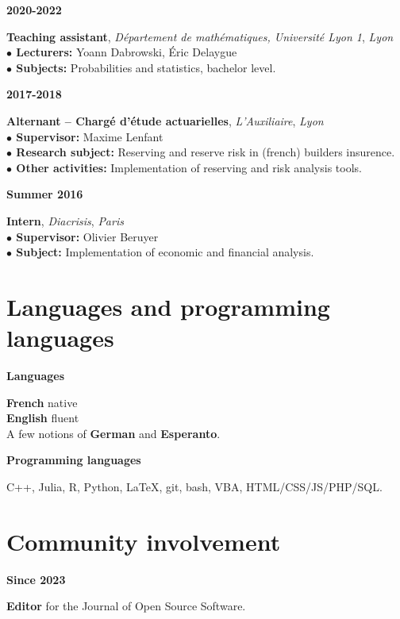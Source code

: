 \documentclass[a4paper,11pt]{article}
\newcommand{\tabcv}[2]{
\begin{minipage}[t]{0.12\linewidth}
\textbf{\footnotesize #1}
\end{minipage}\hfill
\begin{minipage}[t]{0.85\linewidth}
#2
\end{minipage}
\vspace{1em}
}
\begin{document}
\begin{flushleft}
\tabcv{2020-2022}{
\textbf{Teaching assistant}, \textit{Département de mathématiques, Université Lyon 1}, \textit{Lyon}\\[0.5em]
{\footnotesize
\textbf{$\bullet$ Lecturers:} Yoann Dabrowski, Éric Delaygue\\
\textbf{$\bullet$ Subjects:} Probabilities and statistics, bachelor level.\\
}
}

\tabcv{2017-2018}{
\textbf{Alternant -- Chargé d'étude actuarielles}, \textit{L'Auxiliaire}, \textit{Lyon}\\[0.5em]
{\footnotesize
\textbf{$\bullet$ Supervisor:} Maxime Lenfant\\
\textbf{$\bullet$ Research subject:} Reserving and reserve risk in (french) builders insurence.\\
\textbf{$\bullet$ Other activities:} Implementation of reserving and risk analysis tools.\\
}
}


\tabcv{Summer 2016}{
\textbf{Intern}, \textit{Diacrisis}, \textit{Paris}\\[0.5em]
{\footnotesize
\textbf{$\bullet$ Supervisor:} Olivier Beruyer\\
\textbf{$\bullet$ Subject:} Implementation of economic and financial analysis. \\
}
}

\end{flushleft}

\section{Languages and programming languages}
\tabcv{Languages}{
\textbf{French} native\\ 
\textbf{English} fluent\\ 
A few notions of \textbf{German} and \textbf{Esperanto}.\\
}
\tabcv{Programming languages}{
C++, Julia, R, Python, \LaTeX, git, bash, VBA, HTML/CSS/JS/PHP/SQL.\\
}

\section{Community involvement}
\tabcv{Since 2023}{
\textbf{Editor} for the {{Journal of Open Source Software}}.\\[0.5em]
}
\end{document}
